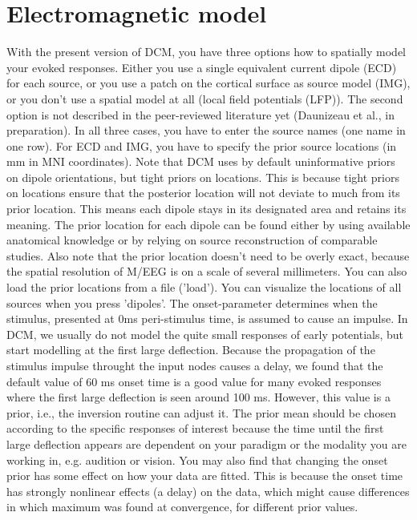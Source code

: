 \section{Electromagnetic model}
With the present version of DCM, you have three options how to spatially
model your evoked responses. Either you use a single equivalent
current dipole (ECD) for each source, or you use a patch on the
cortical surface as source model (IMG), or you don't use a spatial model at all (local field potentials (LFP)). The second option is not
described in the peer-reviewed literature yet (Daunizeau et al., in
preparation). In all three cases, you have to enter the source names (one
name in one row). For ECD and IMG, you have to specify the prior source locations (in mm in MNI
coordinates). Note that DCM uses by default uninformative priors on  
dipole orientations, but tight priors on locations. This is because tight priors on locations ensure that the posterior location will not deviate to much from its prior location. This means each dipole stays in its designated area and retains its meaning. The prior location for each
dipole can be found either by using available anatomical knowledge or
by relying on source reconstruction of comparable studies. Also note
that the prior location doesn't need to be overly exact, because the
spatial resolution of M/EEG is on a scale of several millimeters. 
You can also load the prior locations from a file
('load'). You can visualize the locations of all sources when you
press 'dipoles'. The onset-parameter determines when the stimulus,
presented at 0ms peri-stimulus time, is assumed to cause an
impulse. In DCM, we usually do not model the quite small responses of
early potentials, but start modelling at the first large
deflection. Because the propagation of the stimulus impulse throught
the input nodes causes a delay, we found that the default value of 60
ms onset time is a good value for many evoked responses where the
first large deflection is seen around 100 ms. However, this value is a
prior, i.e., the inversion routine can adjust it. The prior mean should be chosen according to the specific responses of interest because the time until the first large deflection appears are dependent on your paradigm or the modality you are working in, e.g. audition or vision. 
You may also find that changing the onset prior has some effect on how your data are
fitted. This is because the onset time has strongly nonlinear effects
(a delay) on the data, which might cause differences in which maximum
was found at convergence, for different prior values. 

